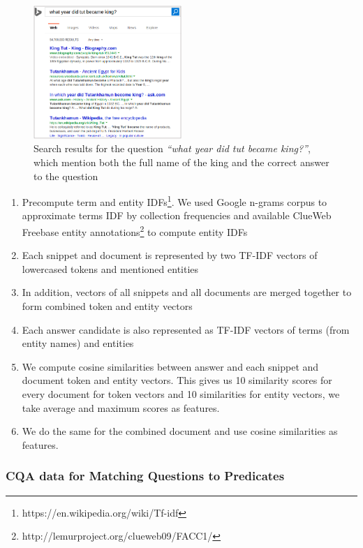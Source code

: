 \begin{figure}[h]
\centering
\includegraphics[width=0.5\textwidth]{img/web_search_entitylink}
\caption{Search results for the question \textit{``what year did tut became king?''}, which mention both the full name of the king and the correct answer to the question}
\label{fig:text2kb:web_search_entitylink}
\end{figure}

\begin{enumerate}
\setlength\itemsep{-0.5em}
\item Precompute term and entity IDFs\footnote{https://en.wikipedia.org/wiki/Tf-idf}. We used Google n-grams corpus to approximate terms IDF by collection frequencies and available ClueWeb Freebase entity annotations\footnote{http://lemurproject.org/clueweb09/FACC1/} to compute entity IDFs
\item Each snippet and document is represented by two TF-IDF vectors of lowercased tokens and mentioned entities
\item In addition, vectors of all snippets and all documents are merged together to form combined token and entity vectors
\item Each answer candidate is also represented as TF-IDF vectors of terms (from entity names) and entities
\item We compute cosine similarities between answer and each snippet and document token and entity vectors. This gives us 10 similarity scores for every document for token vectors and 10 similarities for entity vectors, we take average and maximum scores as features.
\item We do the same for the combined document and use cosine similarities as features.
\end{enumerate}

\subsubsection{CQA data for Matching Questions to Predicates}
\label{subsubsec:text2kb:method:cqa}

